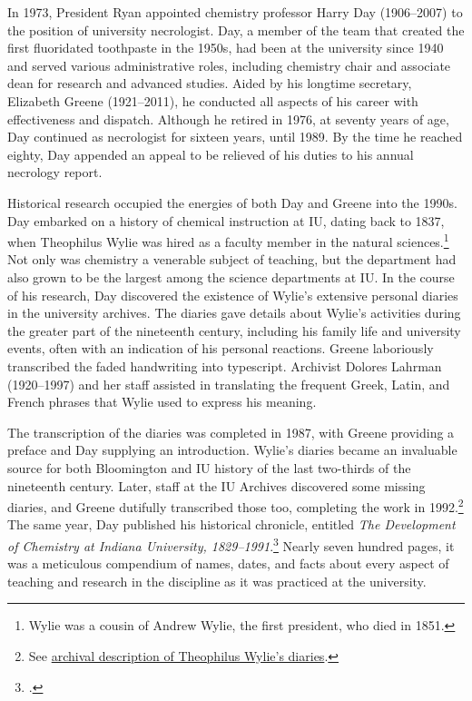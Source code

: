 \documentclass[
  american,
  letterpaper,
]{scrreprt}
\begin{document}
In 1973, President Ryan appointed chemistry professor Harry Day
(1906--2007) to the position of university necrologist. Day, a member of
the team that created the first fluoridated toothpaste in the 1950s, had
been at the university since 1940 and served various administrative
roles, including chemistry chair and associate dean for research and
advanced studies. Aided by his longtime secretary, Elizabeth Greene
(1921--2011), he conducted all aspects of his career with effectiveness
and dispatch. Although he retired in 1976, at seventy years of age, Day
continued as necrologist for sixteen years, until 1989. By the time he
reached eighty, Day appended an appeal to be relieved of his duties to
his annual necrology report.

Historical research occupied the energies of both Day and Greene into
the 1990s. Day embarked on a history of chemical instruction at IU,
dating back to 1837, when Theophilus Wylie was hired as a faculty member
in the natural sciences.\footnote{Wylie was a cousin of Andrew Wylie,
  the first president, who died in 1851.} Not only was chemistry a
venerable subject of teaching, but the department had also grown to be
the largest among the science departments at IU. In the course of his
research, Day discovered the existence of Wylie's extensive personal
diaries in the university archives. The diaries gave details about
Wylie's activities during the greater part of the nineteenth century,
including his family life and university events, often with an
indication of his personal reactions. Greene laboriously transcribed the
faded handwriting into typescript. Archivist Dolores Lahrman
(1920--1997) and her staff assisted in translating the frequent Greek,
Latin, and French phrases that Wylie used to express his meaning.

The transcription of the diaries was completed in 1987, with Greene
providing a preface and Day supplying an introduction. Wylie's diaries
became an invaluable source for both Bloomington and IU history of the
last two-thirds of the nineteenth century. Later, staff at the IU
Archives discovered some missing diaries, and Greene dutifully
transcribed those too, completing the work in 1992.\footnote{See
  \href{https://archives.iu.edu/catalog/InU-Ar-VAA1230}{archival
  description of Theophilus Wylie's diaries}.} The same year, Day
published his historical chronicle, entitled \emph{The Development of
Chemistry at Indiana University, 1829--1991}.\footnote{.} Nearly seven
hundred pages, it was a meticulous compendium of names, dates, and facts
about every aspect of teaching and research in the discipline as it was
practiced at the university.
\end{document}
